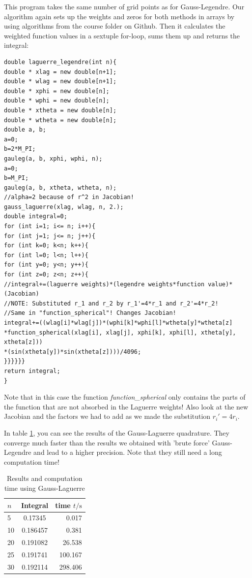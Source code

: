 \documentclass[10pt,a4paper]{article}
\begin{document}
This program takes the same number of grid points as for Gauss-Legendre. Our algorithm again sets up the weights and zeros for both methods in arrays by using algorithms from the course folder on Github. Then it calculates the weighted function values in a sextuple for-loop, sums them up and returns the integral:
\begin{lstlisting}
double laguerre_legendre(int n){
double * xlag = new double[n+1];
double * wlag = new double[n+1];
double * xphi = new double[n];
double * wphi = new double[n];
double * xtheta = new double[n];
double * wtheta = new double[n];
double a, b;
a=0;
b=2*M_PI;
gauleg(a, b, xphi, wphi, n);
a=0;
b=M_PI;
gauleg(a, b, xtheta, wtheta, n);
//alpha=2 because of r^2 in Jacobian!
gauss_laguerre(xlag, wlag, n, 2.);
double integral=0;
for (int i=1; i<= n; i++){
for (int j=1; j<= n; j++){
for (int k=0; k<n; k++){
for (int l=0; l<n; l++){
for (int y=0; y<n; y++){
for (int z=0; z<n; z++){
//integral+=(laguerre weights)*(legendre weights*function value)*(Jacobian)
//NOTE: Substituted r_1 and r_2 by r_1'=4*r_1 and r_2'=4*r_2!
//Same in "function_spherical"! Changes Jacobian!
integral+=((wlag[i]*wlag[j])*(wphi[k]*wphi[l]*wtheta[y]*wtheta[z]
*function_spherical(xlag[i], xlag[j], xphi[k], xphi[l], xtheta[y], xtheta[z]))
*(sin(xtheta[y])*sin(xtheta[z])))/4096;
}}}}}}
return integral;
}
\end{lstlisting}
Note that in this case the function \emph{function\_spherical} only contains the parts of the function that are not absorbed in the Laguerre weights! Also look at the new Jacobian and the factors we had to add as we made the substitution $r_i'=4r_i$.

In table \ref{results_lag}, you can see the results of the Gauss-Laguerre quadrature. They converge much faster than the results we obtained with 'brute force' Gauss-Legendre and lead to a higher precision. Note that they still need a long computation time!

\begin{table}[h]
	\caption{Results and computation time using Gauss-Laguerre\label{results_lag}}
	\centering
	\begin{tabular}{lcr}
		$n$	&	Integral	&	time $t/\mathrm{s}$	\\\hline
		5	&	0.17345	&	0.017	\\
		10	&	0.186457	&	0.381	\\
		20	&	0.191082	&	26.538	\\
		25	&	0.191741	&	100.167	\\
		30	&	0.192114	&	298.406	
	\end{tabular}
\end{table}
\end{document}
